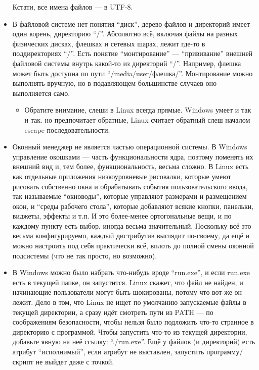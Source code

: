 \documentclass{../../text-style}
\begin{document}
\begin{itemize}
        Кстати, все имена файлов --- в UTF-8.
    \item В файловой системе нет понятия \enquote{диск}, дерево файлов и директорий имеет один корень, директорию \enquote{/}.
        Абсолютно всё, включая файлы на разных физических дисках, флешках и сетевых шарах, лежит где-то в поддиректориях \enquote{/}.
        Есть понятие \enquote{монтирование} --- \enquote{прививание} внешней файловой системы внутрь какой-то из директорий \enquote{/}.
        Например, флешка может быть доступна по пути \enquote{/media/user/флешка/}.
        Монтирование можно выполнять вручную, но в подавляющем большинстве случаев оно выполняется само.
    \begin{itemize}
        \item Обратите внимание, слеши в Linux всегда прямые. 
            Windows умеет и так и так. но предпочитает обратные, Linux считает обратный слеш началом escape-последовательности.
    \end{itemize}
    \item Оконный менеджер не является частью операционной системы.
        В Windows управление окошками --- часть функциональности ядра, поэтому поменять их внешний вид и, тем более, функциональность, весьма сложно.
        В Linux есть как отдельные приложения низкоуровневые рисовалки, которые умеют рисовать собственно окна и обрабатывать события пользовательского ввода, так называемые \enquote{окноводы}, которые управляют размерами и размещением окон, и \enquote{среды рабочего стола}, которые добавляют всякие кнопки, панельки, виджеты, эффекты и т.п.
        И это более-менее ортогональные вещи, и по каждому пункту есть выбор, иногда весьма значительный.
        Поскольку всё это весьма конфигурируемо, каждый дистрибутив выглядит по-своему, да ещё и можно настроить под себя практически всё, вплоть до полной смены оконной подсистемы (что не так просто, но возможно).
    \item В Windows можно было набрать что-нибудь вроде \enquote{run.exe}, и если run.exe есть в текущей папке, он запустится.
        Linux скажет, что файл не найден, и начинающие пользователи могут быть шокированы, потому что вот же он лежит.
        Дело в том, что Linux не ищет по умолчанию запускаемые файлы в текущей директории, а сразу идёт смотреть пути из PATH --- по соображениям безопасности, чтобы нельзя было подложить что-то странное в директорию с программой.
        Чтобы запустить что-то из текущей директории, добавьте явную на неё ссылку: \enquote{./run.exe}.
        Ещё у файлов (и директорий) есть атрибут \enquote{исполнимый}, если атрибут не выставлен, запустить программу/скрипт не выйдет даже с точкой.

\end{itemize}
\end{document}
